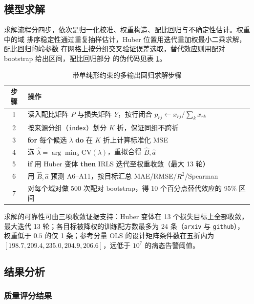 \documentclass[bwprint]{gmcmthesis}
\numberwithin{equation}{section}
\numberwithin{figure}{section}
\numberwithin{table}{section}
\begin{document}
\subsection{模型求解}

求解流程分四步，依次是归一化校准、权重构造、配比回归与不确定性估计。权重中的域
排序稳定性通过重复抽样估计，Huber 位置用迭代重加权最小二乘求解，配比回归的岭参数
在网格上按分组交叉验证误差选取，替代效应则用配对 bootstrap 给出区间，配比回归部分
的伪代码见表 \ref{alg:q1-solve}。

\begin{table}[htp!]
\centering
\renewcommand\arraystretch{1.2}
\caption{带单纯形约束的多输出回归求解步骤}\label{alg:q1-solve}
\begin{tabularx}{\textwidth}{cX}
\toprule
步骤 & 操作 \\
\midrule
1 & 读入配比矩阵 $P$ 与损失矩阵 $Y$，按行闭合 $p_{rj}\leftarrow x_{rj}/\sum_k x_{rk}$ \\
2 & 按来源分组（\texttt{index}）划分 $K$ 折，保证同组不跨折 \\
3 & \textbf{for} 每个候选 $\lambda$ \textbf{do} 在 $K$ 折上计算标准化 MSE \\
4 & 选 $\hat\lambda=\arg\min_\lambda \mathrm{CV}(\lambda)$，重拟合得 $\hat B,\hat a$ \\
5 & \textbf{if} 用 Huber 变体 \textbf{then} IRLS 迭代至权重收敛（最大 13 轮） \\
6 & 用 $\hat B,\hat a$ 预测 A6--A11，按目标汇总 MAE/RMSE/$R^2$/Spearman \\
7 & 对每个域对做 500 次配对 bootstrap，得 10 个百分点替代效应的 95\% 区间 \\
\bottomrule
\end{tabularx}
\end{table}

求解的可靠性可由三项收敛证据支持：Huber 变体在 13 个损失目标上全部收敛，最大迭代
13 轮；各目标被降权的训练配方数最多为 24 条（\texttt{arxiv} 与 \texttt{github}），
权重低于 $0.5$ 的仅 1 条；参考分量 OLS 的设计矩阵条件数在五折内为
$[198.7,209.4,235.0,204.9,206.6]$，远低于 $10^7$ 的病态告警阈值。

\subsection{结果分析}

\subsubsection{质量评分结果}
\end{document}
